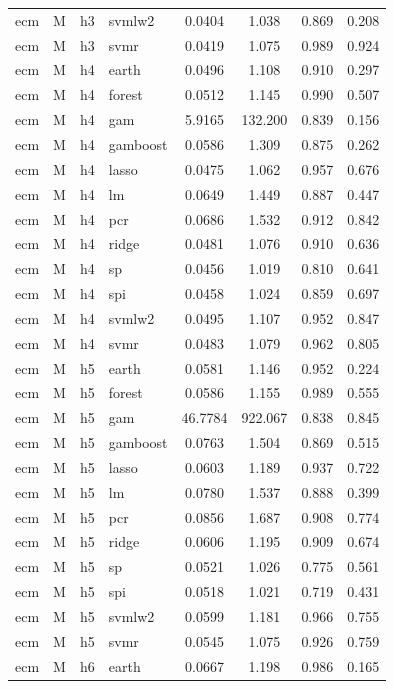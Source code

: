 \begin{ThreePartTable}
\begin{longtable}[t]{llclcccc}
ecm & M & h3 & svmlw2 & 0.0404 & 1.038 & 0.869 & 0.208\\
ecm & M & h3 & svmr & 0.0419 & 1.075 & 0.989 & 0.924\\
\addlinespace
ecm & M & h4 & earth & 0.0496 & 1.108 & 0.910 & 0.297\\
ecm & M & h4 & forest & 0.0512 & 1.145 & 0.990 & 0.507\\
ecm & M & h4 & gam & 5.9165 & 132.200 & 0.839 & 0.156\\
ecm & M & h4 & gamboost & 0.0586 & 1.309 & 0.875 & 0.262\\
ecm & M & h4 & lasso & 0.0475 & 1.062 & 0.957 & 0.676\\
ecm & M & h4 & lm & 0.0649 & 1.449 & 0.887 & 0.447\\
ecm & M & h4 & pcr & 0.0686 & 1.532 & 0.912 & 0.842\\
ecm & M & h4 & ridge & 0.0481 & 1.076 & 0.910 & 0.636\\
ecm & M & h4 & sp & 0.0456 & 1.019 & 0.810 & 0.641\\
ecm & M & h4 & spi & 0.0458 & 1.024 & 0.859 & 0.697\\
ecm & M & h4 & svmlw2 & 0.0495 & 1.107 & 0.952 & 0.847\\
ecm & M & h4 & svmr & 0.0483 & 1.079 & 0.962 & 0.805\\
\addlinespace
ecm & M & h5 & earth & 0.0581 & 1.146 & 0.952 & 0.224\\
ecm & M & h5 & forest & 0.0586 & 1.155 & 0.989 & 0.555\\
ecm & M & h5 & gam & 46.7784 & 922.067 & 0.838 & 0.845\\
ecm & M & h5 & gamboost & 0.0763 & 1.504 & 0.869 & 0.515\\
ecm & M & h5 & lasso & 0.0603 & 1.189 & 0.937 & 0.722\\
ecm & M & h5 & lm & 0.0780 & 1.537 & 0.888 & 0.399\\
ecm & M & h5 & pcr & 0.0856 & 1.687 & 0.908 & 0.774\\
ecm & M & h5 & ridge & 0.0606 & 1.195 & 0.909 & 0.674\\
ecm & M & h5 & sp & 0.0521 & 1.026 & 0.775 & 0.561\\
ecm & M & h5 & spi & 0.0518 & 1.021 & 0.719 & 0.431\\
ecm & M & h5 & svmlw2 & 0.0599 & 1.181 & 0.966 & 0.755\\
ecm & M & h5 & svmr & 0.0545 & 1.075 & 0.926 & 0.759\\
\addlinespace
ecm & M & h6 & earth & 0.0667 & 1.198 & 0.986 & 0.165\\

\end{longtable}
\end{ThreePartTable}
